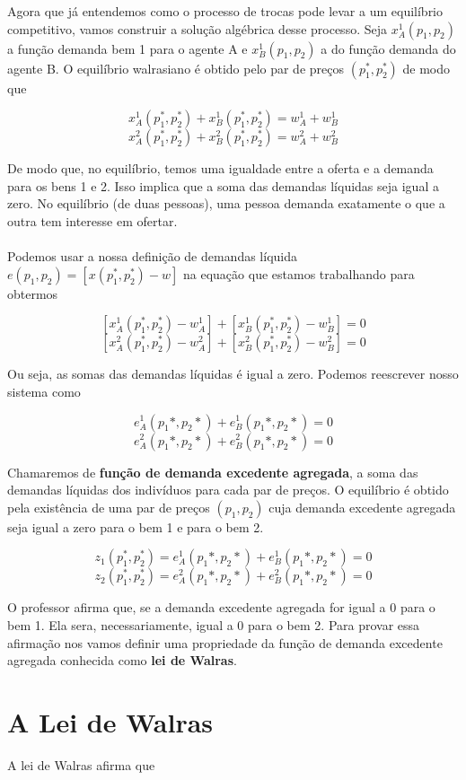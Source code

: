 \documentclass[a4paper,11pt,oneside]{book}
\theoremstyle{definition}
\theoremstyle{break}
\begin{document}
Agora que já entendemos como o processo de trocas pode levar a um equilíbrio competitivo, vamos construir a solução algébrica desse processo. Seja $x_A^1(p_1,p_2)$ a função demanda  bem 1 para o agente A e $x_B^1(p_1,p_2)$ a do função demanda do agente B. O equilíbrio walrasiano é obtido pelo par de preços $(p_1^*,p_2^*)$ de modo que

$$ x_A^1(p_1^*,p_2^*) + x_B^1(p_1^*,p_2^*) = w_A^1 + w_B^1 $$
$$ x_A^2(p_1^*,p_2^*) + x_B^2(p_1^*,p_2^*) = w_A^2 + w_B^2 $$

De modo que, no equilíbrio, temos uma igualdade entre a oferta e a demanda para os bens 1 e 2. Isso implica que a soma das demandas líquidas seja igual a zero. No equilíbrio (de duas pessoas), uma pessoa demanda exatamente o que a outra tem interesse em ofertar.
\\~\\
Podemos usar a nossa definição de demandas líquida $e(p_1,p_2) = [x(p_1^*,p_2^*) - w]$ na equação que estamos trabalhando para obtermos

$$ [x_A^1(p_1^*,p_2^*) - w_A^1] + [x_B^1(p_1^*,p_2^*) - w_B^1] = 0 $$
$$ [x_A^2(p_1^*,p_2^*) - w_A^2] + [x_B^2(p_1^*,p_2^*) - w_B^2] = 0 $$

Ou seja, as somas das demandas líquidas é igual a zero. Podemos reescrever nosso sistema como

$$ e_A^1(p_1*,p_2*) + e_B^1(p_1*,p_2*) = 0 $$
$$ e_A^2(p_1*,p_2*) + e_B^2(p_1*,p_2*) = 0 $$


Chamaremos de \textbf{função de demanda excedente agregada}, a soma das demandas líquidas dos indivíduos para cada par de preços. O equilíbrio é obtido pela existência de uma par de preços $(p_1,p_2)$ cuja demanda excedente agregada seja igual a zero para o bem 1 e para o bem 2.

$$z_1(p_1^*,p_2^*) = e_A^1(p_1*,p_2*) + e_B^1(p_1*,p_2*) = 0$$
$$z_2(p_1^*,p_2^*) = e_A^2(p_1*,p_2*) + e_B^2(p_1*,p_2*) = 0$$


O professor afirma que, se a demanda excedente agregada for igual a 0 para o bem 1. Ela sera, necessariamente, igual a 0 para o bem 2. Para provar essa afirmação nos vamos definir uma propriedade da função de demanda excedente agregada conhecida como \textbf{lei de Walras}.

\section{A Lei de Walras}

A lei de Walras afirma que
\end{document}
